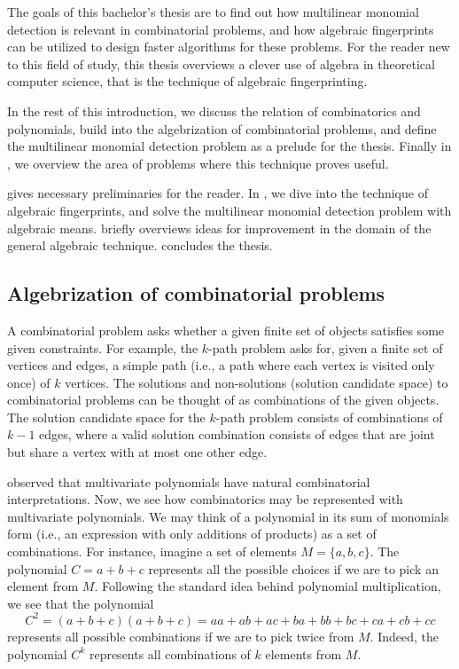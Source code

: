 The goals of this bachelor's thesis are 
to find out how multilinear monomial detection is relevant in combinatorial problems, 
and how algebraic fingerprints can be utilized to design faster 
algorithms for these problems. For the reader new to this field of study, 
this thesis overviews a clever use of algebra in theoretical computer science, 
that is the technique of algebraic fingerprinting.

In the rest of this introduction, 
we discuss the relation of combinatorics and 
polynomials, build into the algebrization of combinatorial problems, and 
define the multilinear monomial detection problem as a prelude for the thesis. 
Finally in , 
we overview the area of problems where this technique proves useful.

 gives necessary 
preliminaries for the reader. In , we 
dive into the technique of algebraic fingerprints, and solve the 
multilinear monomial detection problem with algebraic means. 
 briefly overviews ideas for 
improvement in the domain of the general algebraic technique. 
 concludes the thesis.

\subsection{Algebrization of combinatorial problems}
\label{sect:algebrization}

A combinatorial problem asks whether a given 
finite set of objects satisfies some given constraints. 
For example, the $k$-path problem asks for, given a finite set of vertices and edges, 
a simple path (i.e., a path where each vertex is visited only once) of $k$ vertices. 
The solutions and non-solutions (solution candidate space) 
to combinatorial problems can be thought of as 
combinations of the given objects. 
The solution candidate space for the $k$-path problem 
consists of combinations of $k-1$ edges, where 
a valid solution combination consists of edges that are joint but 
share a vertex with at most one other edge.

\textcite{Valiant92} observed that 
multivariate polynomials have natural combinatorial interpretations. 
Now, we see how combinatorics may be represented with multivariate polynomials. 
We may think of a polynomial in its sum of monomials 
form (i.e., an expression with only additions of products) 
as a set of combinations. For instance, imagine a set of elements $M = \{a, b, c\}$. 
The polynomial $C = a+b+c$ represents all the possible choices 
if we are to pick an element from $M$. Following the standard idea behind polynomial 
multiplication, we see that the polynomial 
\[
  C^2 = (a+b+c)(a+b+c) = aa + ab + ac + ba + bb + bc + ca + cb + cc
\]
represents 
all possible combinations if we are to pick twice from $M$. 
Indeed, the polynomial $C^k$ represents all combinations of $k$ elements from $M$.

